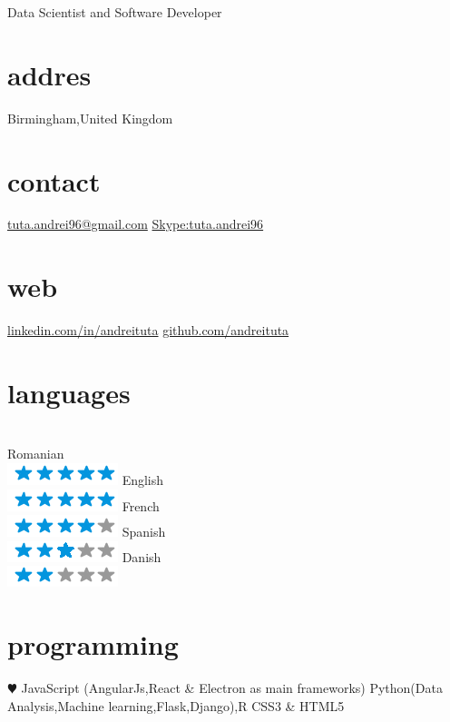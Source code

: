 \documentclass[]{friggeri-cv}
\begin{document}
       {Data Scientist and Software Developer}


\begin{aside}
  \section{addres}
    Birmingham,United Kingdom
    ~
    \section{contact}
    \href{mailto:tuta.andrei96@gmail.com}{tuta.andrei96@gmail.com}
    \href{Skype : tuta.andrei96}{Skype:tuta.andrei96}
    ~
    \section{web}
    \href{linkedin.com/in/andreituta}{linkedin.com/in/andreituta}
    \href{github.com/andreituta}{github.com/andreituta}
    
  \section{languages} 
  \\Romanian \\ \includegraphics[scale=0.30]{img/5stars.png}
  English \\ \includegraphics[scale=0.30]{img/5stars.png}
  French \\ \includegraphics[scale=0.30]{img/4stars.png}
  Spanish \\ \includegraphics[scale=0.30]{img/3stars.png}
  Danish \\ \includegraphics[scale=0.30]{img/2stars.png}
    ~
    
  \section{programming}
    {\color{red} $\varheartsuit$} JavaScript
    (AngularJs,React \& Electron as main frameworks)
    Python(Data Analysis,Machine learning,Flask,Django),R 
    CSS3 \& HTML5
    

\end{aside}
\end{document}
